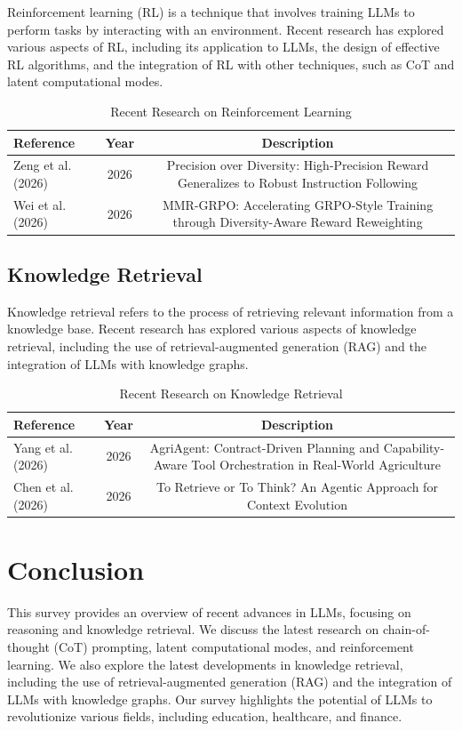 \documentclass{article}
\begin{document}
Reinforcement learning (RL) is a technique that involves training LLMs to perform tasks by interacting with an environment. Recent research has explored various aspects of RL, including its application to LLMs, the design of effective RL algorithms, and the integration of RL with other techniques, such as CoT and latent computational modes.

\begin{table}[H]
\centering
\begin{tabular}{|l|c|c|}
\hline
\textbf{Reference} & \textbf{Year} & \textbf{Description} \\
\hline
Zeng et al. (2026) & 2026 & Precision over Diversity: High-Precision Reward Generalizes to Robust Instruction Following \\
\hline
Wei et al. (2026) & 2026 & MMR-GRPO: Accelerating GRPO-Style Training through Diversity-Aware Reward Reweighting \\
\hline
\end{tabular}
\caption{Recent Research on Reinforcement Learning}
\label{tab:RL}
\end{table}

\subsection{Knowledge Retrieval}

Knowledge retrieval refers to the process of retrieving relevant information from a knowledge base. Recent research has explored various aspects of knowledge retrieval, including the use of retrieval-augmented generation (RAG) and the integration of LLMs with knowledge graphs.

\begin{table}[H]
\centering
\begin{tabular}{|l|c|c|}
\hline
\textbf{Reference} & \textbf{Year} & \textbf{Description} \\
\hline
Yang et al. (2026) & 2026 & AgriAgent: Contract-Driven Planning and Capability-Aware Tool Orchestration in Real-World Agriculture \\
\hline
Chen et al. (2026) & 2026 & To Retrieve or To Think? An Agentic Approach for Context Evolution \\
\hline
\end{tabular}
\caption{Recent Research on Knowledge Retrieval}
\label{tab:KR}
\end{table}

\section{Conclusion}

This survey provides an overview of recent advances in LLMs, focusing on reasoning and knowledge retrieval. We discuss the latest research on chain-of-thought (CoT) prompting, latent computational modes, and reinforcement learning. We also explore the latest developments in knowledge retrieval, including the use of retrieval-augmented generation (RAG) and the integration of LLMs with knowledge graphs. Our survey highlights the potential of LLMs to revolutionize various fields, including education, healthcare, and finance.
\end{document}
